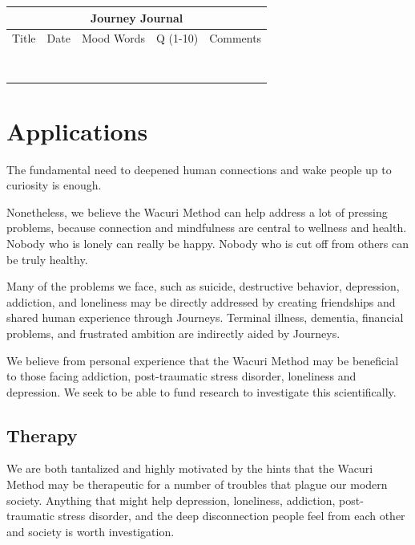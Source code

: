 \documentclass[12pt]{book}
\begin{document}
\begin{tabular}{ |p{2cm}||p{2cm}|p{3cm}|p{1cm}|p{5cm}|  }
 \hline
 \multicolumn{5}{|c|}{Journey Journal} \\
 \hline
 Title& Date & Mood Words & Q (1-10) & Comments\\
  \hline
 \hline
 & & & & \\
 \hline 
 & & & & \\
 \hline 
 & & & & \\
 \hline 
 & & & & \\
 \hline 
 & & & & \\
 \hline 
 & & & & \\
 \hline 
 & & & & \\
 \hline 
  & & & & \\
 \hline
  \hline
\end{tabular}

\chapter{Applications}

The fundamental need to deepened human connections and wake people up
to curiosity is enough.

Nonetheless, we believe the Wacuri Method can help address a lot of
pressing problems, because connection and mindfulness are central to
wellness and health. Nobody who is lonely can really be happy. Nobody
who is cut off from others can be truly healthy.

Many of the problems we face, such as suicide, destructive behavior,
depression, addiction, and loneliness may be directly addressed by
creating friendships and shared human experience through
Journeys. Terminal illness, dementia, financial problems, and
frustrated ambition are indirectly aided by Journeys.

We believe from personal experience that the Wacuri Method may be
beneficial to those facing addiction, post-traumatic stress disorder,
loneliness and depression.  We seek to be able to fund research to
investigate this scientifically.

\section{Therapy}

We are both tantalized and highly motivated by the hints that the
Wacuri Method may be therapeutic for a number of troubles that plague
our modern society. Anything that might help depression, loneliness,
addiction, post-traumatic stress disorder, and the deep disconnection
people feel from each other and society is worth investigation.
\end{document}
